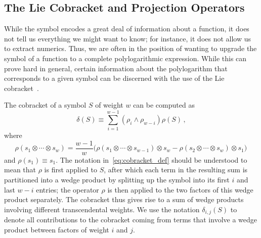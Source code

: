 \documentclass[11pt]{article}
\begin{document}


\subsection{The Lie Cobracket and Projection Operators}
\label{sec:lie_cobracket}

While the symbol encodes a great deal of information about a function, it does not tell us everything we might want to know; for instance, it does not allow us to extract numerics. Thus, we are often in the position of wanting to upgrade the symbol of a function to a complete polylogarithmic expression. While this can prove hard in general, certain information about the polylogarithm that corresponds to a given symbol can be discerned with the use of the Lie cobracket~\cite{Golden:2013xva}. 

The cobracket of a symbol $S$ of weight $w$ can be computed as
\begin{equation} \label{eq:cobracket_def}
\delta(S) \equiv \sum_{i=1}^{w-1} (\rho_i \wedge \rho_{w-i})\rho(S) \, ,
\end{equation}
where
\begin{equation}
\rho(s_1 \otimes \cdots \otimes s_w ) = \frac{w-1}{w} \Big(\rho(s_1 \otimes \cdots \otimes s_{w-1}) \otimes s_w - \rho(s_2 \otimes \cdots \otimes s_{w}) \otimes s_1 \Big) \, 
\end{equation}
and $\rho(s_1) \equiv s_1$. The notation in~\eqref{eq:cobracket_def} should be understood to mean that $\rho$ is first applied to $S$, after which each term in the resulting sum is partitioned into a wedge product by splitting up the symbol into its first $i$ and last $w{-}i$ entries; the operator $\rho$ is then applied to the two factors of this wedge product separately. The cobracket thus gives rise to a sum of wedge products involving different transcendental weights. We use the notation $\delta_{i,j}(S)$ to denote all contributions to the cobracket coming from terms that involve a wedge product between factors of weight $i$ and $j$. 
\end{document}
